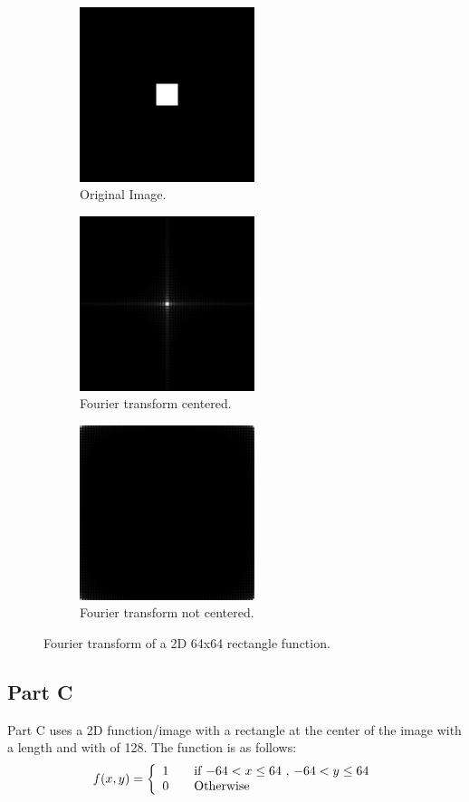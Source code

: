 \documentclass[letter]{article}
\begin{document}
\begin{figure}[hbtp]
  \centering
  \begin{subfigure}{5.1cm}
    \includegraphics[width=5.1cm]{images/rect_512_64x64.png}
    \caption{Original Image.}
  \end{subfigure}
  \begin{subfigure}{5.1cm}
    \includegraphics[width=5.1cm]{images/rect_512_64x64_FU_centered.png}
    \caption{Fourier transform centered.}
  \end{subfigure}
  \begin{subfigure}{5.1cm}
    \includegraphics[width=5.1cm]{images/rect_512_64x64_FU.png}
    \caption{Fourier transform not centered.}
  \end{subfigure}
  \caption{Fourier transform of a 2D 64x64 rectangle function.}
  \label{fig:ft_6464}
\end{figure}
\subsection{Part C}
Part C uses a 2D function/image with a rectangle at the center of the image with a length and with of 128. The function is as follows: $$f(x,y) = \left \{ \begin{array}{l l} 1 & \quad \text{if $-64 < x \leq 64$ , $-64 < y \leq 64$}\\ 0 & \quad \text{Otherwise}\end{array} \right.$$
\end{document}

